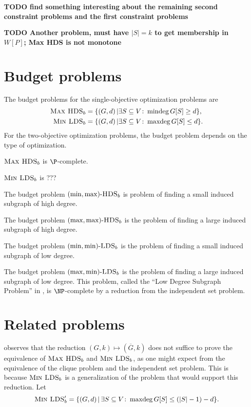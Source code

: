 \documentclass{article}
\newcommand{\todo}[1]{\textbf{TODO #1}}
\newcommand{\dash}{\textnormal{-}}
\DeclareMathOperator{\mindeg}{mindeg}
\DeclareMathOperator{\maxdeg}{maxdeg}
\begin{document}
\todo{find something interesting about the remaining second constraint problems and the first constraint problems}

\todo{Another problem, must have $|S| = k$ to get membership in $W[P]$; Max HDS is not monotone}

\section{Budget problems}

The budget problems for the single-objective optimization problems are
\begin{align*}
  \textsc{Max HDS}_b & = \{ (G, d) \, | \exists S \subseteq V \colon \mindeg G[S] \geq d\}, \\
  \textsc{Min LDS}_b & = \{ (G, d) \, | \exists S \subseteq V \colon \maxdeg G[S] \leq d\}.
\end{align*}
For the two-objective optimization problems, the budget problem depends on the type of optimization.

\begin{theorem}[{\autocite{am84}}]
  $\textsc{Max HDS}_b$ is $\P$-complete.
\end{theorem}

\begin{theorem}
  $\textsc{Min LDS}_b$ is ???
\end{theorem}

The budget problem $(\min, \max)\dash\textsc{HDS}_b$ is problem of finding a small induced subgraph of high degree.

The budget problem $(\max, \max)\dash\textsc{HDS}_b$ is the problem of finding a large induced subgraph of high degree.

The budget problem $(\min, \min)\dash\textsc{LDS}_b$ is the problem of finding a small induced subgraph of low degree.

The budget problem $(\max, \min)\dash\textsc{LDS}_b$ is the problem of finding a large induced subgraph of low degree.
This problem, called the ``Low Degree Subgraph Problem'' in \autocite[Definition~4.4]{greenlaw89}, is $\NP$-complete by a reduction from the independent set problem.

\section{Related problems}

\autocite{greenlaw89} observes that the reduction $(G, k) \mapsto (\overline{G}, k)$ does not suffice to prove the equivalence of $\textsc{Max HDS}_b$ and $\textsc{Min LDS}_b$, as one might expect from the equivalence of the clique problem and the independent set problem.
This is because $\textsc{Min LDS}_b$ is a generalization of the problem that would support this reduction.
Let
\[
\textsc{Min LDS}_b' = \{ (G, d) \, | \, \exists S \subseteq V \colon \maxdeg G[S] \leq (|S| - 1) - d\}.
\]
\end{document}
